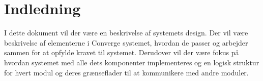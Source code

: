 \chapter{Indledning}

I dette dokument vil der være en beskrivelse af systemets design. Der vil være beskrivelse af elementerne i Converge systemet, hvordan de passer og arbejder sammen for at opfylde kravet til systemet.  Derudover vil der være fokus på hvordan systemet med alle dets komponenter implementeres og en logisk struktur for hvert modul og deres grænseflader til at kommunikere med andre moduler.  